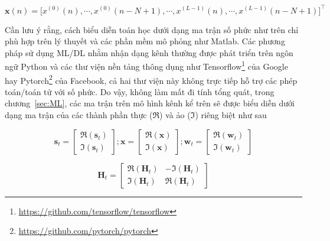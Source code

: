\begin{equation}
        \mathbf{x}(n) = \big[x^{(0)}(n), \cdots, x^{(0)}(n-N+1), \cdots, 
        x^{(L-1)}(n), \cdots, x^{(L-1)}(n-N+1)\big]^\top
\end{equation} 

Cần lưu ý rằng, cách biểu diễn toán học dưới dạng ma trận số phức như trên chỉ phù hợp trên lý thuyết và các phần mềm mô phỏng như Matlab. Các phương pháp sử dụng ML/DL nhằm nhận dạng kênh thường được phát triển trên ngôn ngữ Python và các thư viện nền tảng thông dụng như Tensorflow\footnote{\url{https://github.com/tensorflow/tensorflow}} của Google hay Pytorch\footnote{\url{https://github.com/pytorch/pytorch}} của Facebook, cả hai thư viện này không trực tiếp hỗ trợ các phép toán/toán tử với số phức. Do vậy, không làm mất đi tính tổng quát, trong chương~\ref{sec:ML}, các ma trận trên mô hình kênh kể trên sẽ được biểu diễn dưới dạng ma trận của các thành phần thực ($\Re$) và ảo ($\Im$) riêng biệt như sau

\begin{equation}
\label{eq:matrixtras1}
    \mathbf{s}_t=\left[\begin{array}{l}
    \Re(\mathbf{s}_t) \\
    \Im(\mathbf{s}_t)
    \end{array}\right] ;
    \mathbf{x}=\left[\begin{array}{l}
    \Re(\mathbf{x}) \\
    \Im(\mathbf{x})
    \end{array}\right] ; 
    \mathbf{w}_t=\left[\begin{array}{l}
    \Re(\mathbf{w}_t) \\
    \Im(\mathbf{w}_t)
    \end{array}\right]
\end{equation}

\begin{equation}
\label{eq:matrixtras2}
    \mathbf{H}_t=\left[\begin{array}{cc}
    \Re(\mathbf{H}_t) & -\Im(\mathbf{H}_t) \\
    \Im(\mathbf{H}_t) & \Re(\mathbf{H}_t)
    \end{array}\right]
\end{equation}

